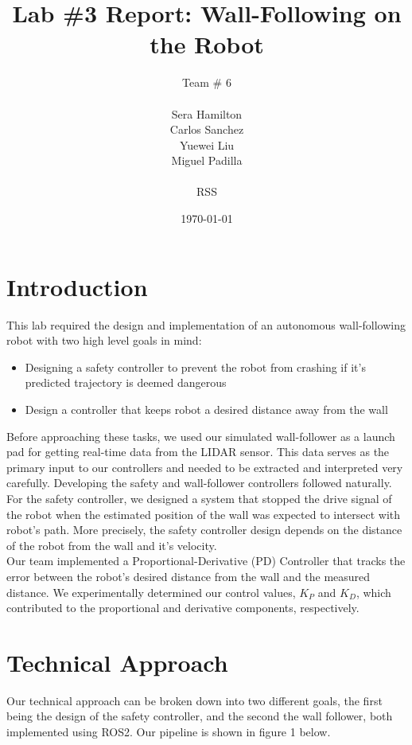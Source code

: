 \documentclass{article}
\title{Lab \#3 Report: Wall-Following on the Robot} %
\author{Team \# 6\\\\ Sera Hamilton \\ Carlos Sanchez \\ Yuewei Liu \\ Miguel Padilla \\ \\ RSS} %
\date{\today} %
\begin{document}
\maketitle

\section{Introduction}

This lab required the design and implementation of an autonomous wall-following robot with two high level goals in mind:
\begin{itemize}
    \item Designing a safety controller to prevent the robot from crashing if it's predicted trajectory is deemed dangerous
    \item Design a controller that keeps robot a desired distance away from the wall
\end{itemize}

Before approaching these tasks, we used our simulated wall-follower as a launch pad for getting real-time data from the LIDAR sensor. This data serves as the primary input to our controllers and needed to be extracted and interpreted very carefully. Developing the safety and wall-follower controllers followed naturally.\\

For the safety controller, we designed a system that stopped the drive signal of the robot when the estimated position of the wall was expected to intersect with robot's path. More precisely, the safety controller design depends on the distance of the robot from the wall and it's velocity.\\

Our team implemented a Proportional-Derivative (PD) Controller that tracks the error between the robot’s desired distance from the wall and the measured distance. We experimentally determined our control values, $K_P$ and $K_D$, which contributed to the proportional and derivative components, respectively.\\

   



\section{Technical Approach}
Our technical approach can be broken down into two different goals, the first being the design of the safety controller, and the second the wall follower, both implemented using ROS2. Our pipeline is shown in figure 1 below.
\end{document}
